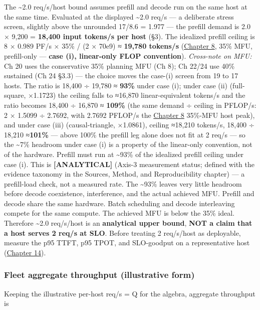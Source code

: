 The \textasciitilde2.0 req/s/host bound assumes prefill and decode run
on the same host at the same time. Evaluated at the displayed
\textasciitilde2.0 req/s --- a deliberate stress screen, slightly above
the unrounded 17/8.6 = 1.977 --- the prefill demand is 2.0 × 9,200 =
\textbf{18,400 input tokens/s per host} (§3). The idealized prefill
ceiling is 8 × 0.989 PF/s × 35\% / (2 × 70e9) ≈ \textbf{19,780 tokens/s}
(\hyperref[chap:8]{Chapter 8}, 35\% MFU, prefill-only --- \textbf{case (i), linear-only
FLOP convention}). \emph{Cross-note on MFU:} Ch 20 uses the conservative
35\% planning MFU (Ch 8); Ch 22/24 use 40\% sustained (Ch 24 §3.3) ---
the choice moves the case-(i) screen from 19 to 17 hosts. The ratio is
18,400 ÷ 19,780 ≈ \textbf{93\%} under case (i); under case (ii)
(full-square, ×1.1723) the ceiling falls to ≈16,870 linear-equivalent
tokens/s and the ratio becomes 18,400 ÷ 16,870 ≈ \textbf{109\%} (the
same demand ÷ ceiling in PFLOP/s: 2 × 1.5099 ÷ 2.7692, with 2.7692
PFLOP/s the \hyperref[chap:8]{Chapter 8} 35\%-MFU host peak), and under case (iii)
(causal-triangle, ×1.0861), ceiling ≈18,210 tokens/s, 18,400 ÷ 18,210
≈\textbf{101\%} --- above 100\% the prefill leg alone does not fit at 2
req/s --- so the \textasciitilde7\% headroom under case (i) is a
property of the linear-only convention, not of the hardware. Prefill
must run at \textasciitilde93\% of the idealized prefill ceiling under
case (i). This is \textbf{\mbox{{[}ANALYTICAL{]}}} (Axis-3 measurement status;
defined with the evidence taxonomy in the Sources, Method, and
Reproducibility chapter) --- a prefill-load check, not a measured rate.
The \textasciitilde93\% leaves very little headroom before decode
coexistence, interference, and the actual achieved MFU. Prefill and
decode share the same hardware. Batch scheduling and decode interleaving
compete for the same compute. The achieved MFU is below the 35\% ideal.
Therefore \textasciitilde2.0 req/s/host is an \textbf{analytical upper
bound}, \textbf{NOT a claim that a host serves 2 req/s at SLO}. Before
treating 2 req/s/host as deployable, measure the p95 TTFT, p95 TPOT, and
SLO-goodput on a representative host (\hyperref[chap:14]{Chapter 14}).

\subsubsection{Fleet aggregate throughput (illustrative
form)}\label{fleet-aggregate-throughput-illustrative-form}

Keeping the illustrative per-host req/s = Q for the algebra, aggregate
throughput is

